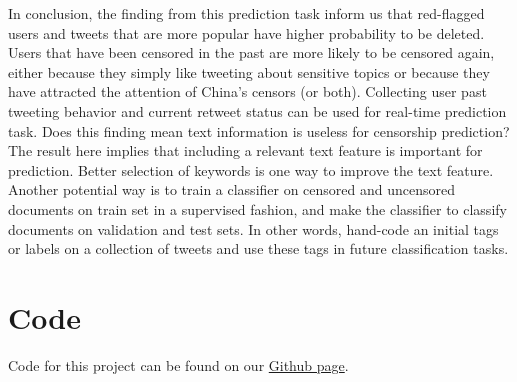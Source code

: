 \documentclass{sig-alternate-05-2015}
\begin{document}
In conclusion, the finding from this prediction task inform us that red-flagged users and tweets that are more popular have higher probability to be deleted. Users that have been censored in the past are more likely to be censored again, either because they simply like tweeting about sensitive topics or because they have attracted the attention of China's censors (or both). Collecting user past tweeting behavior and current retweet status can be used for real-time prediction task.  Does this finding mean text information is useless for censorship prediction? The result here implies that including a relevant text feature is important for prediction. Better selection of keywords is one way to improve the text feature. Another potential way is to train a classifier on censored and uncensored documents on train set in a supervised fashion, and make the classifier to classify documents on validation and test sets. In other words, hand-code an initial tags or labels on a collection of tweets and use these tags in future classification tasks.





\appendix
\section{Code}
Code for this project can be found on our \href{https://github.com/brtsay/CSE190_Assignment2}{Github page}.
\end{document}
